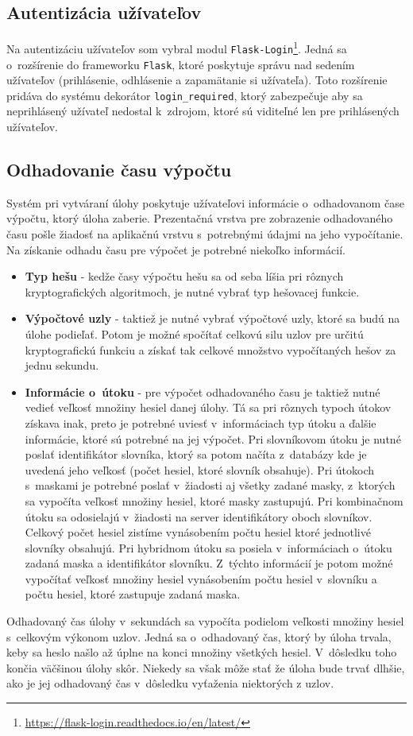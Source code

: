 \documentclass[zadani,slovak]{fitthesis}
\begin{document}
\subsection{Autentizácia užívateľov}
Na autentizáciu užívateľov som vybral modul \texttt{Flask-Login}\footnote{\url{https://flask-login.readthedocs.io/en/latest/}}. Jedná sa o~rozšírenie do frameworku \texttt{Flask}, ktoré poskytuje správu nad sedením užívateľov (prihlásenie, odhlásenie a zapamätanie si užívateľa). Toto rozšírenie pridáva do systému dekorátor \texttt{login\_required}, ktorý zabezpečuje aby sa neprihlásený užívateľ nedostal k~zdrojom, ktoré sú viditeľné len pre prihlásených užívateľov.


\subsection{Odhadovanie času výpočtu}
Systém pri vytváraní úlohy poskytuje užívateľovi informácie o~odhadovanom čase výpočtu, ktorý úloha zaberie. Prezentačná vrstva pre zobrazenie odhadovaného času pošle žiadosť na aplikačnú vrstvu s~potrebnými údajmi na jeho vypočítanie. Na získanie odhadu času pre výpočet je potrebné niekoľko informácií. 
\begin{itemize}
    \item \textbf{Typ hešu} - kedže časy výpočtu hešu sa od seba líšia pri rôznych kryptografických algoritmoch, je nutné vybrať typ hešovacej funkcie.
    \item \textbf{Výpočtové uzly} - taktiež je nutné vybrať výpočtové uzly, ktoré sa budú na úlohe podieľať. Potom je možné spočítať celkovú silu uzlov pre určitú kryptografickú funkciu a získať tak celkové množstvo vypočítaných hešov za jednu sekundu.
    \item \textbf{Informácie o~útoku} - pre výpočet odhadovaného času je taktiež nutné vedieť veľkosť množiny hesiel danej úlohy. Tá sa pri rôznych typoch útokov získava inak, preto je potrebné uviesť v~informáciach typ útoku a ďalšie informácie, ktoré sú potrebné na jej výpočet. Pri slovníkovom útoku je nutné poslať identifikátor slovníka, ktorý sa potom načíta z~databázy kde je uvedená jeho veľkosť (počet hesiel, ktoré slovník obsahuje). Pri útokoch s~maskami je potrebné poslať v~žiadosti aj všetky zadané masky, z~ktorých sa vypočíta veľkosť množiny hesiel, ktoré masky zastupujú. Pri kombinačnom útoku sa odosielajú v~žiadosti na server identifikátory oboch slovníkov. Celkový počet hesiel zistíme vynásobením počtu hesiel ktoré jednotlivé slovníky obsahujú. Pri hybridnom útoku sa posiela v~informáciach o~útoku zadaná maska a identifikátor slovníku. Z~týchto informácií je potom možné vypočítať veľkosť množiny hesiel vynásobením počtu hesiel v~slovníku a počtu hesiel, ktoré zastupuje zadaná maska.
\end{itemize}
Odhadovaný čas úlohy v~sekundách sa vypočíta podielom veľkosti množiny hesiel s~celkovým výkonom uzlov. Jedná sa o~odhadovaný čas, ktorý by úloha trvala, keby sa heslo našlo až úplne na konci množiny všetkých hesiel. V~dôsledku toho končia väčšinou úlohy skôr. Niekedy sa však môže stať že úloha bude trvať dlhšie, ako je jej odhadovaný čas v~dôsledku vyťaženia niektorých z uzlov.
\end{document}
